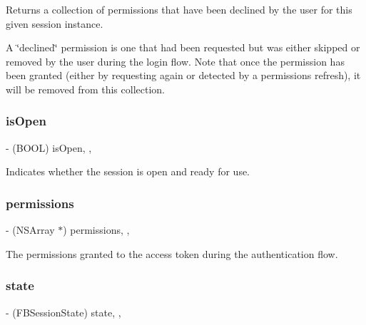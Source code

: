 Returns a collection of permissions that have been declined by the user for this given session instance.

A \char`\"{}declined\char`\"{} permission is one that had been requested but was either skipped or removed by the user during the login flow. Note that once the permission has been granted (either by requesting again or detected by a permissions refresh), it will be removed from this collection. \mbox{\label{interfaceFBSession_ae2c48c214a7a04c16739a7a10c90b03e}} 
\subsubsection{\texorpdfstring{is\+Open}{isOpen}}
{\footnotesize\ttfamily -\/ (B\+O\+OL) is\+Open\hspace{0.3cm}{\ttfamily [read]}, {\ttfamily [atomic]}, {\ttfamily [assign]}}

Indicates whether the session is open and ready for use. \mbox{\label{interfaceFBSession_ad8a201a8de50f40ba5b266fca5c533f8}} 
\subsubsection{\texorpdfstring{permissions}{permissions}}
{\footnotesize\ttfamily -\/ (N\+S\+Array $\ast$) permissions\hspace{0.3cm}{\ttfamily [read]}, {\ttfamily [atomic]}, {\ttfamily [copy]}}

The permissions granted to the access token during the authentication flow. \mbox{\label{interfaceFBSession_a0b25c735da32c34217d482ce2658a76e}} 
\subsubsection{\texorpdfstring{state}{state}}
{\footnotesize\ttfamily -\/ (F\+B\+Session\+State) state\hspace{0.3cm}{\ttfamily [read]}, {\ttfamily [atomic]}, {\ttfamily [assign]}}


